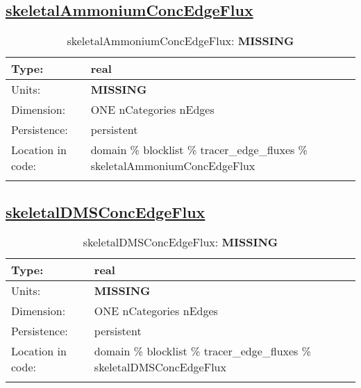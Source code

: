\subsection[skeletalAmmoniumConcEdgeFlux]{\hyperref[sec:var_tab_tracer_edge_fluxes]{skeletalAmmoniumConcEdgeFlux}}
\label{subsec:var_sec_tracer_edge_fluxes_skeletalAmmoniumConcEdgeFlux}
\begin{center}
\begin{longtable}{| p{2.0in} | p{4.0in} |}
        \hline 
        Type: & real \\
        \hline 
        Units: & {\bf \color{red} MISSING} \\
        \hline 
        Dimension: & ONE nCategories nEdges \\
        \hline 
        Persistence: & persistent \\
        \hline 
         Location in code: & domain \% blocklist \% tracer\_edge\_fluxes \% skeletalAmmoniumConcEdgeFlux \\
         \hline 
    \caption{skeletalAmmoniumConcEdgeFlux: {\bf \color{red} MISSING}}
\end{longtable}
\end{center}
\subsection[skeletalDMSConcEdgeFlux]{\hyperref[sec:var_tab_tracer_edge_fluxes]{skeletalDMSConcEdgeFlux}}
\label{subsec:var_sec_tracer_edge_fluxes_skeletalDMSConcEdgeFlux}
\begin{center}
\begin{longtable}{| p{2.0in} | p{4.0in} |}
        \hline 
        Type: & real \\
        \hline 
        Units: & {\bf \color{red} MISSING} \\
        \hline 
        Dimension: & ONE nCategories nEdges \\
        \hline 
        Persistence: & persistent \\
        \hline 
         Location in code: & domain \% blocklist \% tracer\_edge\_fluxes \% skeletalDMSConcEdgeFlux \\
         \hline 
    \caption{skeletalDMSConcEdgeFlux: {\bf \color{red} MISSING}}
\end{longtable}
\end{center}
